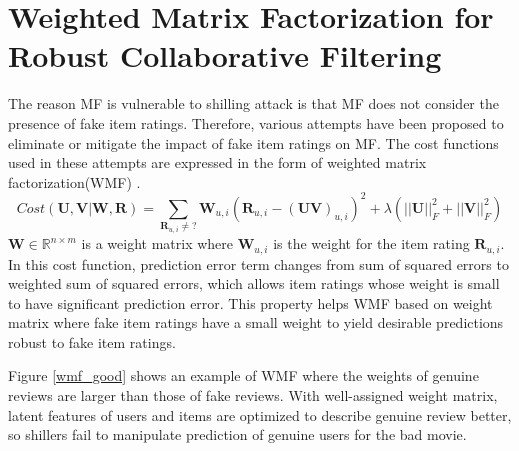 \documentclass[master,english,final]{kaist-ucs}
\begin{document}
\section{Weighted Matrix Factorization for Robust Collaborative Filtering}
The reason MF is vulnerable to shilling attack is that MF does not consider the presence of fake item ratings.
Therefore, various attempts have been proposed to eliminate or mitigate the impact of fake item ratings on MF.
The cost functions used in these attempts are expressed in the form of weighted matrix factorization(WMF) \cite{ImplicitCF}.
\begin{equation}
Cost(\bm{U},\bm{V} | \bm{W}, \bm{R})=\sum_{\bm{R}_{u,i} \neq ?} \bm{W}_{u,i}(  \bm{R}_{u,i} - (\bm{UV})_{u,i} )^2 + \lambda(||\bm{U}||_F^2+||\bm{V}||_F^2)
\end{equation}
$\bm{W} \in \mathbb{R}^{n \times m}$ is a weight matrix where $\bm{W}_{u,i}$ is the weight for the item rating $\bm{R}_{u,i}$.
In this cost function, prediction error term changes from sum of squared errors to weighted sum of squared errors, which allows item ratings whose weight is small to have significant prediction error.
This property helps WMF based on weight matrix where fake item ratings have a small weight to yield desirable predictions robust to fake item ratings.

Figure \ref{wmf_good} shows an example of WMF where the weights of genuine reviews are larger than those of fake reviews.
With well-assigned weight matrix, latent features of users and items are optimized to describe genuine review better, so shillers fail to manipulate prediction of genuine users for the bad movie.
\end{document}
